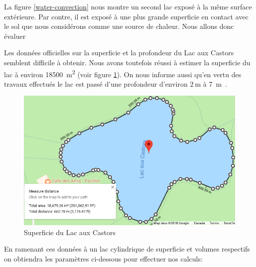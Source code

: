 \documentclass[12pt]{article}
\numberwithin{figure}{section}
\begin{document}
La figure \ref{water-convection} nous montre un second lac expos\'e \`a la m\^eme surface
ext\'erieure. Par contre, il est expos\'e \`a une plus grande superficie en contact avec le sol que
nous consid\'erons comme une source de chaleur. Nous allons donc \'evaluer

Les donn\'ees officielles sur la superficie et la profondeur du Lac aux Castors semblent difficile
\`a obtenir. Nous avons toutefois r\'eussi \`a estimer la superficie du lac \`a environ
\SI{18500}{\square\meter} (voir figure \ref{google-castor}). On nous informe aussi qu'en vertu des travaux effectu\'es le lac est
pass\'e d'une profondeur d'environ $\SI{2}\meter$ \`a \SI{7}\meter~\cite{Lac-Castor}.

\begin{figure}\label{google-castor}
    \centering
    \includegraphics[scale=0.5]{Superficie.png}
    \caption{Superficie du Lac aux Castors}
\end{figure}

En ramenant ces donn\'ees \`a un lac cylindrique de superficie et volumes respectifs on obtiendra
les param\`etres ci-dessous pour effectuer nos calculs:
\end{document}
